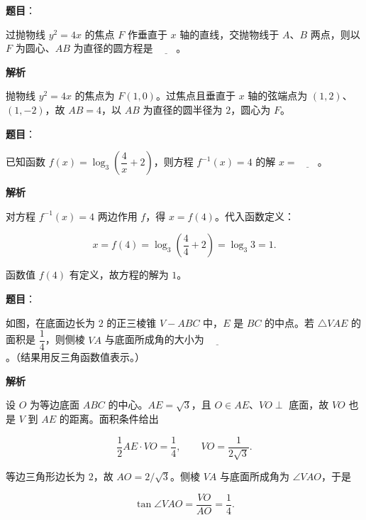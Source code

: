 \begin{answer}

\textbf{题目}：

过抛物线 $y^2=4x$ 的焦点 $F$ 作垂直于 $x$ 轴的直线，交抛物线于 $A$、$B$ 两点，则以 $F$ 为圆心、$AB$ 为直径的圆方程是 $\underline{\qquad}$。

\textbf{解析}

抛物线 $y^2=4x$ 的焦点为 $F(1,0)$。过焦点且垂直于 $x$ 轴的弦端点为 $(1,2)$、$(1,-2)$，故 $AB=4$，以 $AB$ 为直径的圆半径为 $2$，圆心为 $F$。


\end{answer}
\begin{answer}

\textbf{题目}：

已知函数 $f(x)=\log_3\left(\dfrac{4}{x}+2\right)$，则方程 $f^{-1}(x)=4$ 的解 $x=\underline{\qquad}$。

\textbf{解析}

对方程 $f^{-1}(x)=4$ 两边作用 $f$，得 $x=f(4)$。代入函数定义：

\nopagebreak[4]
\[x=f(4)=\log_3\left(\frac44+2\right)=\log_3 3=1.\]

函数值 $f(4)$ 有定义，故方程的解为 $1$。


\end{answer}
\begin{answer}

\textbf{题目}：

如图，在底面边长为 $2$ 的正三棱锥 $V-ABC$ 中，$E$ 是 $BC$ 的中点。若 $\triangle VAE$ 的面积是 $\dfrac{1}{4}$，则侧棱 $VA$ 与底面所成角的大小为 $\underline{\qquad}$。（结果用反三角函数值表示。）
\nopagebreak[4]
\begin{center}\end{center}
\nopagebreak[4]
\textbf{解析}

设 $O$ 为等边底面 $ABC$ 的中心。$AE=\sqrt3$，且 $O\in AE$、$VO\perp$ 底面，故 $VO$ 也是 $V$ 到 $AE$ 的距离。面积条件给出

\nopagebreak[4]
\[\frac12 AE\cdot VO=\frac14,\qquad VO=\frac1{2\sqrt3}.\]

等边三角形边长为 $2$，故 $AO=2/\sqrt3$。侧棱 $VA$ 与底面所成角为 $\angle VAO$，于是

\nopagebreak[4]
\[\tan\angle VAO=\frac{VO}{AO}=\frac14.\]


\end{answer}
